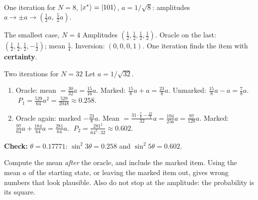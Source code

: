 \documentclass[11pt,a4paper,openany]{book}
\newcounter{wex}[section]
\newenvironment{keepfig}{\par\noindent\begin{minipage}{\linewidth}\centering}{\end{minipage}\par\medskip}
\newenvironment{steps}{\begin{enumerate}[label=\textbf{Step \arabic*.}, leftmargin=4.2em, itemsep=2pt]}{\end{enumerate}}
\newcommand{\xs}{x^\ast}
\begin{document}
\begin{keepfig}
\\
{\small One iteration for $N = 8$, $\ket{\xs} = \ket{101}$, $a = 1/\sqrt8$: amplitudes $a \to \pm a \to (\frac12a,\ \frac52a)$.}
\end{keepfig}

\begin{wexample}{The smallest case, $N = 4$}
Amplitudes $(\frac12, \frac12, \frac12, \frac12)$. Oracle on the last: $(\frac12, \frac12, \frac12, -\frac12)$; mean $\frac14$. Inversion: $(0, 0, 0, 1)$. One iteration finds the item with \textbf{certainty}.
\end{wexample}

\begin{wexample}{Two iterations for $N = 32$}
Let $a = 1/\sqrt{32}$.
\begin{steps}
\item Oracle: mean $= \frac{30}{32}a = \frac{15}{16}a$. Marked: $\frac{15}{8}a + a = \frac{23}{8}a$. Unmarked: $\frac{15}{8}a - a = \frac78a$. $\;P_1 = \frac{529}{64}a^2 = \frac{529}{2048} \approx 0.258$.
\item Oracle again: marked $-\frac{23}{8}a$. Mean $= \frac{31\cdot\frac78 - \frac{23}{8}}{32}a = \frac{194}{256}a = \frac{97}{128}a$. Marked: $\frac{97}{64}a + \frac{184}{64}a = \frac{281}{64}a$. $\;P_2 = \frac{281^2}{64^2\cdot32} \approx 0.602$.
\end{steps}
\textbf{Check:} $\theta = 0.17771$: $\sin^2 3\theta = 0.258$ and $\sin^2 5\theta = 0.602$. \checkmark
\end{wexample}

\begin{trap}
Compute the mean \emph{after} the oracle, and include the marked item. Using the mean $a$ of the starting state, or leaving the marked item out, gives wrong numbers that look plausible. Also do not stop at the amplitude: the probability is its square.
\end{trap}
\end{document}

